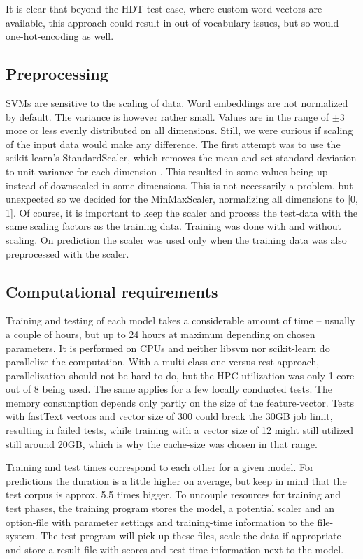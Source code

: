 \documentclass[11pt,a4paper]{article}
\begin{document}
It is clear that beyond the HDT test-case, where custom word vectors are available, this approach could result in out-of-vocabulary issues, but so would one-hot-encoding as well.


\subsection{Preprocessing}
SVMs are sensitive to the scaling of data. Word embeddings are not normalized by default. The variance is however rather small. Values are in the range of $\pm 3$ more or less evenly distributed on all dimensions. Still, we were curious if scaling of the input data would make any difference. The first attempt was to use the scikit-learn's StandardScaler, which removes the mean and set standard-deviation to unit variance for each dimension . This resulted in some values being up- instead of downscaled in some dimensions. This is not necessarily a problem, but unexpected so we decided for the MinMaxScaler, normalizing all dimensions to [0, 1]. Of course, it is important to keep the scaler and process the test-data with the same scaling factors as the training data. Training was done with and without scaling. On prediction the scaler was used only when the training data was also preprocessed with the scaler.


\subsection{Computational requirements}
Training and testing of each model takes a considerable amount of time -- usually a couple of hours, but up to 24 hours at maximum depending on chosen parameters. It is performed on CPUs and neither libsvm nor scikit-learn do parallelize the computation. With a multi-class one-versus-rest approach, parallelization should not be hard to do, but the HPC utilization was only 1 core out of 8 being used. The same applies for a few locally conducted tests. The memory consumption depends only partly on the size of the feature-vector. Tests with fastText vectors and vector size of 300 could break the 30GB job limit, resulting in failed tests, while training with a vector size of 12 might still utilized still around 20GB, which is why the cache-size was chosen in that range.

Training and test times correspond to each other for a given model. For predictions the duration is a little higher on average, but keep in mind that the test corpus is approx. 5.5 times bigger. To uncouple resources for training and test phases, the training program stores the model, a potential scaler and an option-file with parameter settings and training-time information to the file-system. The test program will pick up these files, scale the data if appropriate and store a result-file with scores and test-time information next to the model.
\end{document}
